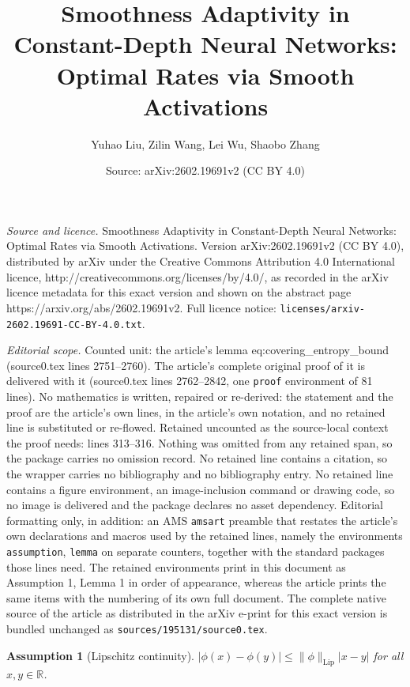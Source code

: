 \documentclass[10pt,a4paper]{amsart}
\title{Smoothness Adaptivity in Constant-Depth Neural Networks: Optimal Rates via Smooth Activations}
\author{Yuhao Liu, Zilin Wang, Lei Wu, Shaobo Zhang}
\date{Source: arXiv:2602.19691v2 (CC BY 4.0)}
\newtheorem{assumption}{Assumption}
\newcommand{\RR}{\mathbb{R}}
\renewcommand{\le}{\leqslant}
\renewcommand{\leq}{\le}
\begin{document}
\maketitle

\noindent\emph{Source and licence.} Smoothness Adaptivity in Constant-Depth Neural Networks: Optimal Rates via Smooth Activations. Version arXiv:2602.19691v2 (CC BY 4.0), distributed by arXiv under the Creative Commons Attribution 4.0 International licence, http://creativecommons.org/licenses/by/4.0/, as recorded in the arXiv licence metadata for this exact version and shown on the abstract page https://arxiv.org/abs/2602.19691v2. Full licence notice: \texttt{licenses/arxiv-2602.19691-CC-BY-4.0.txt}.\par\smallskip

\noindent\textit{Editorial scope.} Counted unit: the article's lemma eq:covering\_entropy\_bound (source0.tex lines 2751--2760). The article's complete original proof of it is delivered with it (source0.tex lines 2762--2842, one \texttt{proof} environment of 81 lines). No mathematics is written, repaired or re-derived: the statement and the proof are the article's own lines, in the article's own notation, and no retained line is substituted or re-flowed.  Retained uncounted as the source-local context the proof needs: lines 313--316.  Nothing was omitted from any retained span, so the package carries no omission record.  No retained line contains a citation, so the wrapper carries no bibliography and no bibliography entry.  No retained line contains a figure environment, an image-inclusion command or drawing code, so no image is delivered and the package declares no asset dependency.  Editorial formatting only, in addition: an AMS \texttt{amsart} preamble that restates the article's own declarations and macros used by the retained lines, namely the environments \texttt{assumption}, \texttt{lemma} on separate counters, together with the standard packages those lines need.  The retained environments print in this document as Assumption 1, Lemma 1 in order of appearance, whereas the article prints the same items with the numbering of its own full document.  The complete native source of the article as distributed in the arXiv e-print for this exact version is bundled unchanged as \texttt{sources/195131/source0.tex}.
\begin{assumption}[Lipschitz continuity]
     $|\phi(x) - \phi(y)| \leq \|\phi\|_{\mathrm{Lip}} |x-y|$ for all $x, y\in \RR$. 
    \label{ass:Lip}
\end{assumption}
\end{document}
